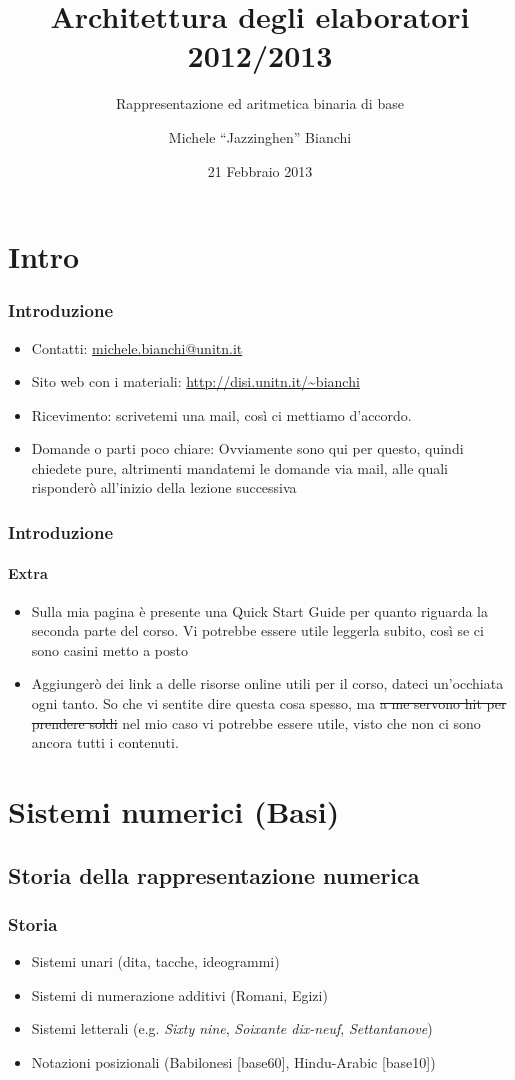 \documentclass{beamer}
\title[Arch2013] %
{Architettura degli elaboratori 2012/2013}
\subtitle{Rappresentazione ed aritmetica binaria di base}
\author{Michele ``Jazzinghen'' Bianchi\inst{1}}
\institute[DISI] %
{
  \inst{1}%
  Dipartimento di Ingegneria e Scienze dell'Informazione\\
  Universtià degli Studi di Trento
}
\date[FEB 2013] %
{21 Febbraio 2013}
\begin{document}
	\frame{\titlepage}
	\section{Intro}
	\begin{frame}
    \frametitle{Introduzione}
		\begin{itemize}
			\item Contatti: \url{michele.bianchi@unitn.it}
		  \item Sito web con i materiali: \url{http://disi.unitn.it/~bianchi}
		  \item Ricevimento: scrivetemi una mail, così ci mettiamo d'accordo.
		  \item Domande o parti poco chiare: Ovviamente sono qui per questo, quindi
		    chiedete pure, altrimenti mandatemi le domande via mail, alle quali
		    risponderò all'inizio della lezione successiva
		\end{itemize}    
   
  \end{frame}
  \begin{frame}
    \frametitle{Introduzione}
    \framesubtitle{Extra}
    \begin{itemize}
    		\item Sulla mia pagina è presente una Quick Start Guide per quanto riguarda
    			la seconda parte del corso. Vi potrebbe essere utile leggerla subito, così
    			se ci sono casini metto a posto
    		\item Aggiungerò dei link a delle risorse online utili per il corso, dateci
    			un'occhiata ogni tanto. So che vi sentite dire questa cosa spesso, ma \st{a me%
    			servono hit per prendere soldi} nel mio caso vi potrebbe essere utile, visto
    			che non ci sono ancora tutti i contenuti.
    \end{itemize}
  \end{frame}

  \section[AllYourBases...]{Sistemi numerici (Basi)}
	\subsection{Storia della rappresentazione numerica}  
  \begin{frame}
    \frametitle{Storia}
    \begin{itemize}
    		\item Sistemi unari (dita, tacche, ideogrammi)
    		\item Sistemi di numerazione additivi (Romani, Egizi)
    		\item Sistemi letterali (e.g. \emph{Sixty nine}, \emph{Soixante dix-neuf}, \emph{Settantanove})
    		\item Notazioni posizionali (Babilonesi [base60], Hindu-Arabic [base10])
    \end{itemize}
  \end{frame}
	
\end{document}
